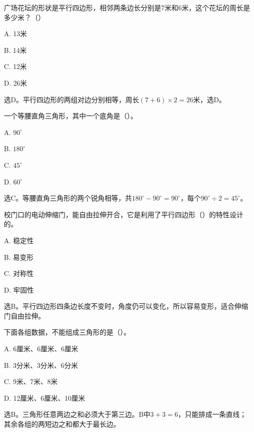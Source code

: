 广场花坛的形状是平行四边形，相邻两条边长分别是7米和6米，这个花坛的周长是多少米？（\hspace{1.8em}）\par
\noindent A. 13米\par
\noindent B. 14米\par
\noindent C. 12米\par
\noindent D. 26米\par
\begin{BookAnswer}
选D。平行四边形的两组对边分别相等，周长\((7+6)\times2=26\)米，选D。
\end{BookAnswer}

一个等腰直角三角形，其中一个底角是（\hspace{1.8em}）。\par
\noindent A. \(90^\circ\)\par
\noindent B. \(180^\circ\)\par
\noindent C. \(45^\circ\)\par
\noindent D. \(60^\circ\)\par
\begin{BookAnswer}
选C。等腰直角三角形的两个锐角相等，共\(180^\circ-90^\circ=90^\circ\)，每个\(90^\circ\div2=45^\circ\)。
\end{BookAnswer}

校门口的电动伸缩门，能自由拉伸开合，它是利用了平行四边形（\hspace{1.8em}）的特性设计的。\par
\noindent A. 稳定性\par
\noindent B. 易变形\par
\noindent C. 对称性\par
\noindent D. 牢固性\par
{}
\begin{BookAnswer}
选B。平行四边形四条边长度不变时，角度仍可以变化，所以容易变形，适合伸缩门自由拉伸。
\end{BookAnswer}

下面各组数据，不能组成三角形的是（\hspace{1.8em}）。\par
\noindent A. 6厘米、6厘米、6厘米\par
\noindent B. 3分米、3分米、6分米\par
\noindent C. 9米、7米、8米\par
\noindent D. 12厘米、6厘米、10厘米\par
\begin{BookAnswer}
选B。三角形任意两边之和必须大于第三边。B中\(3+3=6\)，只能排成一条直线；其余各组的两短边之和都大于最长边。
\end{BookAnswer}

